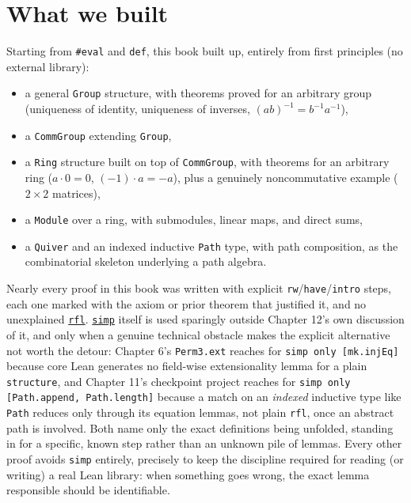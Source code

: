 \section{What we built}\label{sec:13-next-steps:01-what-we-built:1}

Starting from \texttt{\#eval} and \texttt{def}, this book built up, entirely from first principles (no external library):

\begin{itemize}
\tightlist
\item
  a general \texttt{Group} structure, with theorems proved for an arbitrary group (uniqueness of identity, uniqueness of inverses, \((ab)^{-1} = b^{-1}a^{-1}\)),
\item
  a \texttt{CommGroup} extending \texttt{Group},
\item
  a \texttt{Ring} structure built on top of \texttt{CommGroup}, with theorems for an arbitrary ring (\(a \cdot 0 = 0\), \((-1)\cdot a = -a\)), plus a genuinely noncommutative example (\(2\times 2\) matrices),
\item
  a \texttt{Module} over a ring, with submodules, linear maps, and direct sums,
\item
  a \texttt{Quiver} and an indexed inductive \texttt{Path} type, with path composition, as the combinatorial skeleton underlying a path algebra.
\end{itemize}

Nearly every proof in this book was written with explicit \texttt{rw}/\texttt{have}/\texttt{intro} steps, each one marked with the axiom or prior theorem that justified it, and no unexplained \href{https://lean-lang.org/doc/reference/latest/Tactic-Proofs/Tactic-Reference/}{\texttt{rfl}}. \href{https://lean-lang.org/doc/reference/latest/Tactic-Proofs/Tactic-Reference/}{\texttt{simp}} itself is used sparingly outside Chapter 12's own discussion of it, and only when a genuine technical obstacle makes the explicit alternative not worth the detour: Chapter 6's \texttt{Perm3.ext} reaches for \texttt{simp only [mk.injEq]} because core Lean generates no field-wise extensionality lemma for a plain \texttt{structure}, and Chapter 11's checkpoint project reaches for \texttt{simp only [Path.append, Path.length]} because a match on an \emph{indexed} inductive type like \texttt{Path} reduces only through its equation lemmas, not plain \texttt{rfl}, once an abstract path is involved. Both name only the exact definitions being unfolded, standing in for a specific, known step rather than an unknown pile of lemmas. Every other proof avoids \texttt{simp} entirely, precisely to keep the discipline required for reading (or writing) a real Lean library: when something goes wrong, the exact lemma responsible should be identifiable.
